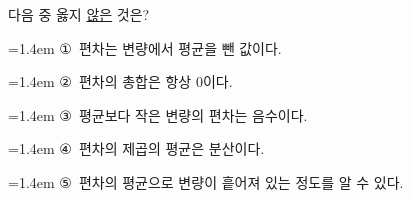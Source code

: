 다음 중 옳지 \underline{않은} 것은?
\par\medskip\par\noindent\hangindent=1.4em {\small ①}\ 편차는 변량에서 평균을 뺀 값이다.\par\noindent\hangindent=1.4em {\small ②}\ 편차의 총합은 항상 $0$이다.\par\noindent\hangindent=1.4em {\small ③}\ 평균보다 작은 변량의 편차는 음수이다.\par\noindent\hangindent=1.4em {\small ④}\ 편차의 제곱의 평균은 분산이다.\par\noindent\hangindent=1.4em {\small ⑤}\ 편차의 평균으로 변량이 흩어져 있는 정도를 알 수 있다.\par\medskip
